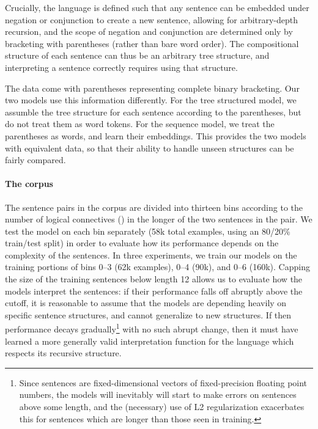 Crucially, the language is defined such that any sentence can be embedded under negation or conjunction to create a new sentence, allowing for arbitrary-depth recursion, and the scope of negation and conjunction are determined only by bracketing with parentheses (rather than bare word order). The compositional structure of each sentence can thus be an arbitrary tree structure, and interpreting a sentence correctly requires using that structure.

The data come with parentheses representing complete binary bracketing. Our two models use this information differently. For the tree structured model, we assumble the tree structure for each sentence according to the parentheses, but do not treat them as word tokens. For the sequence model, we treat the parentheses as words, and learn their embeddings. This provides the two models with equivalent data, so that their ability to handle unseen structures can be fairly compared.

\paragraph{The corpus}
The sentence pairs in the corpus are divided into thirteen bins according to the number of logical connectives () in the longer of the two sentences in the pair. We test the model on each bin separately (58k total examples, using an 80/20\% train/test split) in order to evaluate how its performance depends on the complexity of the sentences. In three experiments, we train our models on the training portions of bins 0--3 (62k examples), 0--4 (90k), and 0--6 (160k). Capping the size of the training sentences below length 12 allows us to evaluate how the models interpret the sentences: if their performance falls off abruptly above the cutoff, it is reasonable to assume that the models are depending heavily on specific sentence structures, and cannot generalize to new structures. If then performance decays gradually\footnote{Since sentences are fixed-dimensional vectors of fixed-precision floating point numbers, the models will inevitably will start to make errors on sentences above some length, and the (necessary) use of L2 regularization exacerbates this for sentences which are longer than those seen in training.} with no such abrupt change, then it must have learned a more generally valid interpretation function for the language which respects its recursive structure.



